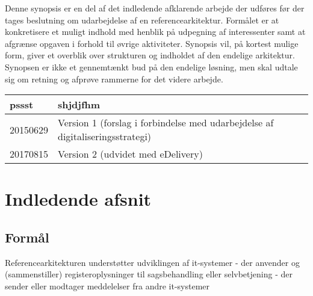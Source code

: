 Denne synopsis er en del af det indledende afklarende arbejde der
udføres før der tages beslutning om udarbejdelse af en
referencearkitektur. Formålet er at konkretisere et muligt indhold med
henblik på udpegning af interessenter samt at afgrænse opgaven i forhold
til øvrige aktiviteter. Synopsis vil, på kortest mulige form, giver et
overblik over strukturen og indholdet af den endelige arkitektur.
Synopsen er ikke et gennemtænkt bud på den endelige løsning, men skal
udtale sig om retning og afprøve rammerne for det videre arbejde.

\begin{longtable}[]{@{}ll@{}}
\toprule
\begin{minipage}[b]{0.05\columnwidth}\raggedright\strut
pssst\strut
\end{minipage} & \begin{minipage}[b]{0.05\columnwidth}\raggedright\strut
shjdjfhm\strut
\end{minipage}\tabularnewline
\midrule
\endhead
\begin{minipage}[t]{0.05\columnwidth}\raggedright\strut
20150629\strut
\end{minipage} & \begin{minipage}[t]{0.05\columnwidth}\raggedright\strut
Version 1 (forslag i forbindelse med udarbejdelse af
digitaliseringsstrategi)\strut
\end{minipage}\tabularnewline
\begin{minipage}[t]{0.05\columnwidth}\raggedright\strut
20170815\strut
\end{minipage} & \begin{minipage}[t]{0.05\columnwidth}\raggedright\strut
Version 2 (udvidet med eDelivery)\strut
\end{minipage}\tabularnewline
\bottomrule
\end{longtable}

\section{Indledende afsnit}\label{indledende-afsnit}

\subsection{Formål}\label{formuxe5l}

Referencearkitekturen understøtter udviklingen af it-systemer - der
anvender og (sammenstiller) registeroplysninger til sagsbehandling eller
selvbetjening - der sender eller modtager meddelelser fra andre
it-systemer

